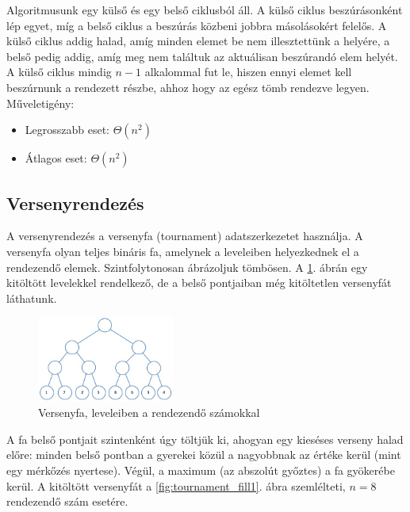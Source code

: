 \documentclass[12pt,margin=0px]{article}
\begin{document}
    Algoritmusunk egy külső és egy belső ciklusból áll. A külső ciklus beszúrásonként lép egyet, míg a belső ciklus a beszúrás közbeni jobbra másolásokért felelős. A külső ciklus addig halad, amíg minden elemet be nem illesztettünk a helyére, a belső pedig addig, amíg meg nem találtuk az aktuálisan beszúrandó elem helyét.\\

    A külső ciklus mindig $n-1$ alkalommal fut le, hiszen ennyi elemet kell beszúrnunk a rendezett részbe, ahhoz hogy az egész tömb rendezve legyen.\\

    \noindent Műveletigény:
    \begin{itemize}
        \item Legrosszabb eset: $\Theta(n^2)$
        \item Átlagos eset: $\Theta(n^2)$
    \end{itemize}

	\subsection*{Versenyrendezés}

    \noindent A versenyrendezés a versenyfa (tournament) adatszerkezetet használja. A versenyfa olyan teljes bináris fa, amelynek a leveleiben helyezkednek el a rendezendő elemek. Szintfolytonosan ábrázoljuk tömbösen. A \ref{fig:tournament_start}. ábrán egy kitöltött levelekkel rendelkező, de a belső pontjaiban még kitöltetlen versenyfát láthatunk.

	\begin{figure}[H]
		\centering
		\includegraphics[width=0.4\textwidth]{img/tournament_start.png}
		\caption{Versenyfa, leveleiben a rendezendő számokkal}
        \label{fig:tournament_start}
	\end{figure}	

    \noindent A fa belső pontjait szintenként úgy töltjük ki, ahogyan egy kieséses verseny halad előre: minden belső pontban a gyerekei közül a nagyobbnak az értéke kerül (mint egy mérkőzés nyertese). Végül, a maximum (az abszolút győztes) a fa gyökerébe kerül. A kitöltött versenyfát a \ref{fig:tournament_fill1}. ábra szemlélteti, $n=8$ rendezendő szám esetére.
\end{document}
